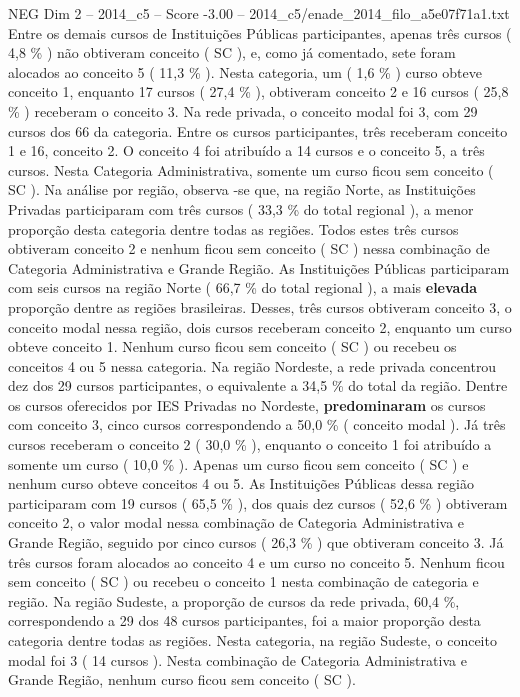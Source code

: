 \begin{textsample}{NEG Dim 2 – 2014\_c5 – Score -3.00 – 2014\_c5/enade\_2014\_filo\_a5e07f71a1.txt}
Entre os demais cursos de Instituições Públicas participantes, apenas três cursos ( 4,8 \% ) não obtiveram conceito ( SC ), e, como já comentado, sete foram alocados ao conceito 5 ( 11,3 \% ).
Nesta categoria, um ( 1,6 \% ) curso obteve conceito 1, enquanto 17 cursos ( 27,4 \% ), obtiveram conceito 2 e 16 cursos ( 25,8 \% ) receberam o conceito 3.
Na rede privada, o conceito modal foi 3, com 29 cursos dos 66 da categoria.
Entre os cursos participantes, três receberam conceito 1 e 16, conceito 2.
O conceito 4 foi atribuído a 14 cursos e o conceito 5, a três cursos.
Nesta Categoria Administrativa, somente um curso ficou sem conceito ( SC ).
Na análise por região, observa -se que, na região Norte, as Instituições Privadas participaram com três cursos ( 33,3 \% do total regional ), a menor proporção desta categoria dentre todas as regiões.
Todos estes três cursos obtiveram conceito 2 e nenhum ficou sem conceito ( SC ) nessa combinação de Categoria Administrativa e Grande Região.
As Instituições Públicas participaram com seis cursos na região Norte ( 66,7 \% do total regional ), a mais \textbf{elevada} proporção dentre as regiões brasileiras.
Desses, três cursos obtiveram conceito 3, o conceito modal nessa região, dois cursos receberam conceito 2, enquanto um curso obteve conceito 1.
Nenhum curso ficou sem conceito ( SC ) ou recebeu os conceitos 4 ou 5 nessa categoria.
Na região Nordeste, a rede privada concentrou dez dos 29 cursos participantes, o equivalente a 34,5 \% do total da região.
Dentre os cursos oferecidos por IES Privadas no Nordeste, \textbf{predominaram} os cursos com conceito 3, cinco cursos correspondendo a 50,0 \% ( conceito modal ).
Já três cursos receberam o conceito 2 ( 30,0 \% ), enquanto o conceito 1 foi atribuído a somente um curso ( 10,0 \% ).
Apenas um curso ficou sem conceito ( SC ) e nenhum curso obteve conceitos 4 ou 5.
As Instituições Públicas dessa região participaram com 19 cursos ( 65,5 \% ), dos quais dez cursos ( 52,6 \% ) obtiveram conceito 2, o valor modal nessa combinação de Categoria Administrativa e Grande Região, seguido por cinco cursos ( 26,3 \% ) que obtiveram conceito 3.
Já três cursos foram alocados ao conceito 4 e um curso no conceito 5.
Nenhum ficou sem conceito ( SC ) ou recebeu o conceito 1 nesta combinação de categoria e região.
Na região Sudeste, a proporção de cursos da rede privada, 60,4 \%, correspondendo a 29 dos 48 cursos participantes, foi a maior proporção desta categoria dentre todas as regiões.
Nesta categoria, na região Sudeste, o conceito modal foi 3 ( 14 cursos ).
Nesta combinação de Categoria Administrativa e Grande Região, nenhum curso ficou sem conceito ( SC ).

\end{textsample}
